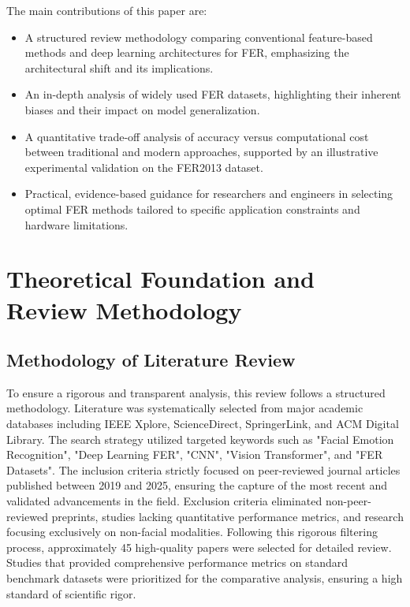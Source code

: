 \documentclass[journal]{IEEEtran}
\begin{document}
The main contributions of this paper are:
\begin{itemize}
    \item A structured review methodology comparing conventional feature-based methods and deep learning architectures for FER, emphasizing the architectural shift and its implications.
    \item An in-depth analysis of widely used FER datasets, highlighting their inherent biases and their impact on model generalization.
    \item A quantitative trade-off analysis of accuracy versus computational cost between traditional and modern approaches, supported by an illustrative experimental validation on the FER2013 dataset.
    \item Practical, evidence-based guidance for researchers and engineers in selecting optimal FER methods tailored to specific application constraints and hardware limitations.
\end{itemize}

\section{Theoretical Foundation and Review Methodology}

\subsection{Methodology of Literature Review}
To ensure a rigorous and transparent analysis, this review follows a structured methodology. Literature was systematically selected from major academic databases including IEEE Xplore, ScienceDirect, SpringerLink, and ACM Digital Library. The search strategy utilized targeted keywords such as "Facial Emotion Recognition", "Deep Learning FER", "CNN", "Vision Transformer", and "FER Datasets". The inclusion criteria strictly focused on peer-reviewed journal articles published between 2019 and 2025, ensuring the capture of the most recent and validated advancements in the field. Exclusion criteria eliminated non-peer-reviewed preprints, studies lacking quantitative performance metrics, and research focusing exclusively on non-facial modalities. Following this rigorous filtering process, approximately 45 high-quality papers were selected for detailed review. Studies that provided comprehensive performance metrics on standard benchmark datasets were prioritized for the comparative analysis, ensuring a high standard of scientific rigor.
\end{document}
